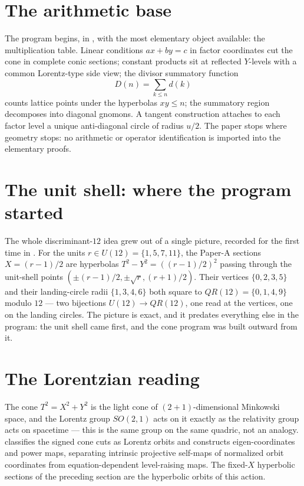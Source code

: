 \documentclass[11pt]{amsart}
\theoremstyle{remark}
\begin{document}
\section{The arithmetic base}

The program begins, in \cite{Ebert2026Table}, with the most elementary
object available: the multiplication table.  Linear conditions
$ax+by=c$ in factor coordinates cut the cone in complete conic
sections; constant products sit at reflected $Y$-levels with a common
Lorentz-type side view; the divisor summatory function
\[
D(n)=\sum_{k\le n} d(k)
\]
counts lattice points under the hyperbolas $xy\le n$; the summatory
region decomposes into diagonal gnomons.  A tangent construction
attaches to each factor level a unique anti-diagonal circle of radius
$u/2$.  The paper stops where geometry stops: no arithmetic or
operator identification is imported into the elementary proofs.

\section{The unit shell: where the program started}

The whole discriminant-$12$ idea grew out of a single picture,
recorded for the first time in \cite{Ebert2026Totient}.  For the units
$r\in U(12)=\{1,5,7,11\}$, the Paper-A sections $X=(r-1)/2$ are
hyperbolas $T^2-Y^2=((r-1)/2)^2$ passing through the unit-shell points
$(\pm(r-1)/2,\pm\sqrt r,(r+1)/2)$.  Their vertices $\{0,2,3,5\}$ and
their landing-circle radii $\{1,3,4,6\}$ both square to
$QR(12)=\{0,1,4,9\}$ modulo $12$ --- two bijections
$U(12)\to QR(12)$, one read at the vertices, one on the landing
circles.  The picture is exact, and it predates everything else in the
program: the unit shell came first, and the cone program was built
outward from it.

\section{The Lorentzian reading}

The cone $T^2=X^2+Y^2$ is the light cone of $(2+1)$-dimensional
Minkowski space, and the Lorentz group $SO(2,1)$ acts on it exactly as
the relativity group acts on spacetime --- this is the same group on
the same quadric, not an analogy.  \cite{Ebert2026EigenCoord}
classifies the signed cone cuts as Lorentz orbits and constructs
eigen-coordinates and power maps, separating intrinsic projective
self-maps of normalized orbit coordinates from equation-dependent
level-raising maps.  The fixed-$X$ hyperbolic sections of the
preceding section are the hyperbolic orbits of this action.
\end{document}
